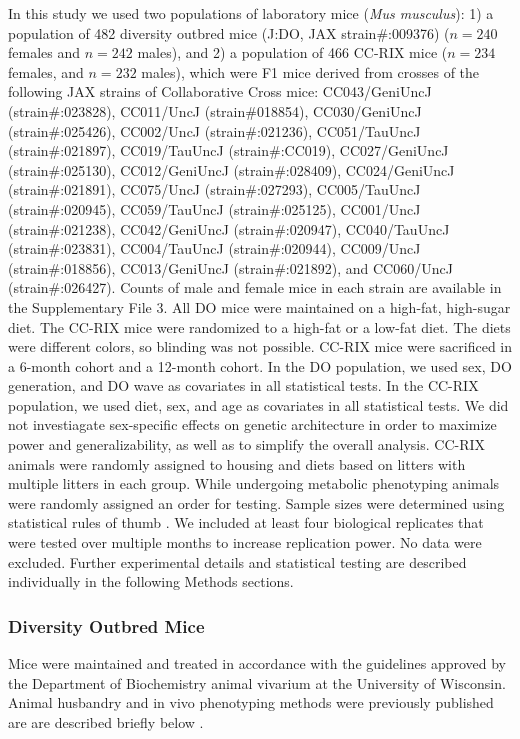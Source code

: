 \documentclass[
]{article}
\begin{document}
In this study we used two populations of laboratory mice
(\textit{Mus musculus}): 1) a population of 482 diversity outbred mice
(J:DO, JAX strain\#:009376) (\(n = 240\) females and \(n = 242\) males),
and 2) a population of 466 CC-RIX mice (\(n = 234\) females, and
\(n = 232\) males), which were F1 mice derived from crosses of the
following JAX strains of Collaborative Cross mice: CC043/GeniUncJ
(strain\#:023828), CC011/UncJ (strain\#018854), CC030/GeniUncJ
(strain\#:025426), CC002/UncJ (strain\#:021236), CC051/TauUncJ
(strain\#:021897), CC019/TauUncJ (strain\#:CC019), CC027/GeniUncJ
(strain\#:025130), CC012/GeniUncJ (strain\#:028409), CC024/GeniUncJ
(strain\#:021891), CC075/UncJ (strain\#:027293), CC005/TauUncJ
(strain\#:020945), CC059/TauUncJ (strain\#:025125), CC001/UncJ
(strain\#:021238), CC042/GeniUncJ (strain\#:020947), CC040/TauUncJ
(strain\#:023831), CC004/TauUncJ (strain\#:020944), CC009/UncJ
(strain\#:018856), CC013/GeniUncJ (strain\#:021892), and CC060/UncJ
(strain\#:026427). Counts of male and female mice in each strain are
available in the Supplementary File 3. All DO mice were maintained on a
high-fat, high-sugar diet. The CC-RIX mice were randomized to a high-fat
or a low-fat diet. The diets were different colors, so blinding was not
possible. CC-RIX mice were sacrificed in a 6-month cohort and a 12-month
cohort. In the DO population, we used sex, DO generation, and DO wave as
covariates in all statistical tests. In the CC-RIX population, we used
diet, sex, and age as covariates in all statistical tests. We did not
investiagate sex-specific effects on genetic architecture in order to
maximize power and generalizability, as well as to simplify the overall
analysis. CC-RIX animals were randomly assigned to housing and diets
based on litters with multiple litters in each group. While undergoing
metabolic phenotyping animals were randomly assigned an order for
testing. Sample sizes were determined using statistical rules of thumb
\cite{van2011statistical}. We included at least four biological
replicates that were tested over multiple months to increase replication
power. No data were excluded. Further experimental details and
statistical testing are described individually in the following Methods
sections.

\subsubsection{Diversity Outbred Mice}\label{diversity-outbred-mice}

Mice were maintained and treated in accordance with the guidelines
approved by the Department of Biochemistry animal vivarium at the
University of Wisconsin. Animal husbandry and in vivo phenotyping
methods were previously published are are described briefly below
\cite{pmid31343992, pmid29567659}.
\end{document}

